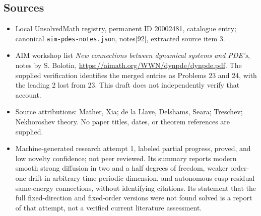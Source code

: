 \documentclass[11pt]{article}
\begin{document}
\subsection{Sources}
\begin{itemize}
\item Local UnsolvedMath registry, permanent ID 20002481, catalogue entry; canonical \texttt{aim-pdes-notes.json}, notes[92], extracted source item 3.
\item AIM workshop list \emph{New connections between dynamical systems and PDE's}, notes by S. Bolotin, \url{https://aimath.org/WWN/dynpde/dynpde.pdf}. The supplied verification identifies the merged entries as Problems 23 and 24, with the leading 2 lost from 23. This draft does not independently verify that account.
\item Source attributions: Mather, Xia; de la Llave, Delshams, Seara; Treschev; Nekhoroshev theory. No paper titles, dates, or theorem references are supplied.
\item Machine-generated research attempt 1, labeled partial progress, proved, and low novelty confidence; not peer reviewed. Its summary reports modern smooth strong diffusion in two and a half degrees of freedom, weaker order-one drift in arbitrary time-periodic dimension, and autonomous cusp-residual same-energy connections, without identifying citations. Its statement that the full fixed-direction and fixed-order versions were not found solved is a report of that attempt, not a verified current literature assessment.
\end{itemize}
\end{document}
